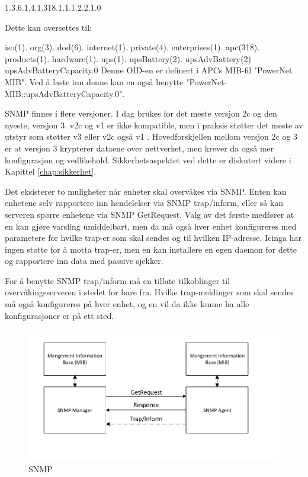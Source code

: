 1.3.6.1.4.1.318.1.1.1.2.2.1.0

Dette kan oversettes til:

iso(1). org(3). dod(6). internet(1). private(4). enterprises(1). apc(318). products(1). hardware(1). ups(1). upsBattery(2). upsAdvBattery(2) upsAdvBatteryCapacity.0
Denne OID-en er definert i APCs MIB-fil "PowerNet MIB". Ved å laste inn denne kan en også benytte "PowerNet-MIB::upsAdvBatteryCapacity.0".

SNMP finnes i flere versjoner. I dag brukes for det meste versjon 2c og den nyeste, versjon 3. v2c og v1 er ikke kompatible, men i praksis støtter det meste av utstyr som støtter v3 eller v2c også v1 \cite{rfc3584}. Hovedforskjellen mellom versjon 2c og 3 er at versjon 3 krypterer dataene over nettverket, men krever da også mer konfigurasjon og vedlikehold. Sikkerhetsaspektet ved dette er diskutert videre i Kapittel \ref{chap:sikkerhet}. 

Det eksisterer to muligheter når enheter skal overvåkes via SNMP. Enten kan enhetene selv rapportere inn hendelelser via SNMP trap/inform, eller så kan serveren spørre enhetene via SNMP GetRequest. Valg av det første medfører at en kan gjøre varsling umiddelbart, men da må også hver enhet konfigureres med parametere for hvilke trap-er som skal sendes og til hvilken IP-adresse. Icinga har ingen støtte for å motta trap-er, men en kan installere en egen daemon for dette og rapportere inn data med passive sjekker. 

For å benytte SNMP trap/inform må en tillate tilkoblinger til overvåkingsserveren i stedet for bare fra. Hvilke trap-meldinger som skal sendes må også konfigureres på hver enhet, og en vil da ikke kunne ha alle konfigurasjoner er på ett sted.

\begin{figure}[H]
    \centering
    \includegraphics{img/SNMP}
    \caption{SNMP}
    \label{SNMP}
\end{figure}

